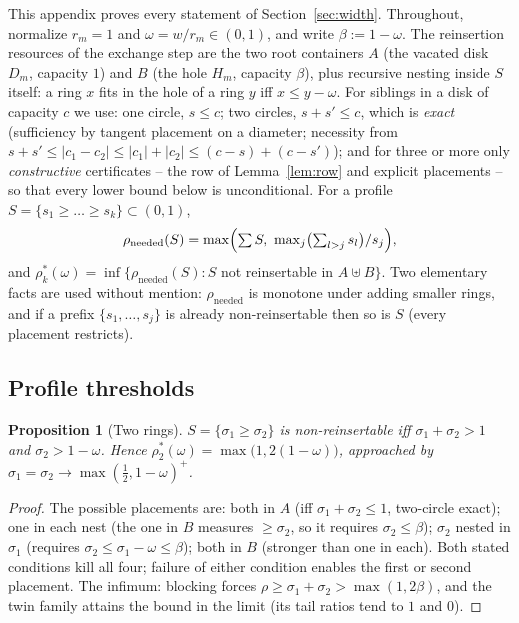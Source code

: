 \documentclass[11pt]{article}
\newtheorem{proposition}[theorem]{Proposition}
\theoremstyle{definition}
\begin{document}
This appendix proves every statement of Section~\ref{sec:width}. Throughout,
normalize $r_m=1$ and $\omega=w/r_m\in(0,1)$, and write $\beta:=1-\omega$.
The reinsertion resources of the exchange step are the two root
containers $A$ (the vacated disk $D_m$, capacity $1$) and $B$ (the
hole $H_m$, capacity $\beta$), plus
recursive nesting inside $S$ itself: a ring $x$ fits in the hole of a ring
$y$ iff $x\le y-\omega$. For siblings in a disk of capacity $c$ we use:
one circle, $s\le c$; two circles, $s+s'\le c$, which is \emph{exact}
(sufficiency by tangent placement on a diameter; necessity from
$s+s'\le|c_1-c_2|\le|c_1|+|c_2|\le(c-s)+(c-s')$); and for three or more
only \emph{constructive} certificates -- the row of
Lemma~\ref{lem:row} and explicit placements -- so that every lower bound
below is unconditional. For a profile $S=\{s_1\ge\dots\ge s_k\}\subset(0,1)$,
\[
\rho_{\mathrm{needed}}(S)=\max\Bigl(\textstyle\sum S,\
\max_j\bigl(\textstyle\sum_{l>j}s_l\bigr)/s_j\Bigr),
\]
and $\rho^*_k(\omega)=\inf\{\rho_{\mathrm{needed}}(S):S$ not reinsertable
in $A\uplus B\}$.
Two elementary facts are used without mention: $\rho_{\mathrm{needed}}$ is
monotone under adding smaller rings, and if a prefix $\{s_1,\dots,s_j\}$ is
already non-reinsertable then so is $S$ (every placement restricts).

\subsection{Profile thresholds}\label{app:profiles}

\begin{proposition}[Two rings]\label{prop:Cpair}
$S=\{\sigma_1\ge\sigma_2\}$ is non-reinsertable iff $\sigma_1+\sigma_2>1$
and $\sigma_2>1-\omega$. Hence $\rho^*_2(\omega)=\max\bigl(1,2(1-\omega)\bigr)$,
approached by $\sigma_1=\sigma_2\to\max(\tfrac12,1-\omega)^+$.
\end{proposition}
\begin{proof}
The possible placements are: both in $A$ (iff $\sigma_1+\sigma_2\le1$,
two-circle exact); one in each nest (the one in $B$ measures
$\ge\sigma_2$, so it requires $\sigma_2\le\beta$); $\sigma_2$ nested in
$\sigma_1$ (requires $\sigma_2\le\sigma_1-\omega\le\beta$); both in $B$
(stronger than one in each). Both stated conditions kill all four; failure
of either condition enables the first or second placement. The infimum:
blocking forces $\rho\ge\sigma_1+\sigma_2>\max(1,2\beta)$, and the twin
family attains the bound in the limit (its tail ratios tend to $1$ and $0$).
\end{proof}
\end{document}
